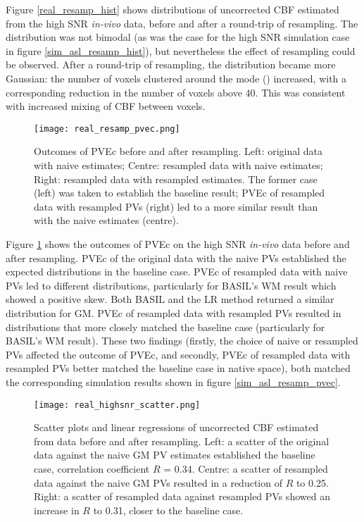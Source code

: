 Figure \ref{real_resamp_hist} shows distributions of uncorrected CBF estimated from the high SNR \textit{in-vivo} data, before and after a round-trip of resampling. The distribution was not bimodal (as was the case for the high SNR simulation case in figure \ref{sim_asl_resamp_hist}), but nevertheless the effect of resampling could be observed. After a round-trip of resampling, the distribution became more Gaussian: the number of voxels clustered around the mode (\cbf{}) increased, with a corresponding reduction in the number of voxels above 40\cbf{}. This was consistent with increased mixing of CBF between voxels. 
 
\begin{figure}[H]
\centering
\texttt{[image: real\_resamp\_pvec.png]}
\caption{Outcomes of PVEc before and after resampling. Left: original data with naive estimates; Centre: resampled data with naive estimates; Right: resampled data with resampled estimates. The former case (left) was taken to establish the baseline result; PVEc of resampled data with resampled PVs (right) led to a more similar result than with the naive estimates (centre).}
\label{real_resamp_pvec}
\end{figure}

Figure \ref{real_resamp_pvec} shows the outcomes of PVEc on the high SNR \textit{in-vivo} data before and after resampling. PVEc of the original data with the naive PVs established the expected distributions in the baseline case. PVEc of resampled data with naive PVs led to different distributions, particularly for BASIL's WM result which showed a positive skew. Both BASIL and the LR method returned a similar distribution for GM. PVEc of resampled data with resampled PVs resulted in distributions that more closely matched the baseline case (particularly for BASIL's WM result). These two findings (firstly, the choice of naive or resampled PVs affected the outcome of PVEc, and secondly, PVEc of resampled data with resampled PVs better matched the baseline case in native space), both matched the corresponding simulation results shown in figure \ref{sim_asl_resamp_pvec}. 


\begin{figure}[H]
\centering
\texttt{[image: real\_highsnr\_scatter.png]}
\caption{Scatter plots and linear regressions of uncorrected CBF estimated from data before and after resampling. Left: a scatter of the original data against the naive GM PV estimates established the baseline case, correlation coefficient $R$ = 0.34. Centre: a scatter of resampled data against the naive GM PVs resulted in a reduction of $R$ to 0.25. Right: a scatter of resampled data against resampled PVs showed an increase in $R$ to 0.31, closer to the baseline case.}
\label{real_highsnr_scatter}
\end{figure}

